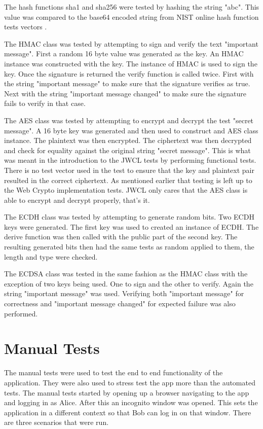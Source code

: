 The hash functions sha1 and sha256 were tested by hashing the string "abc". This value was compared to the base64 encoded string from NIST online hash function tests vectors \cite{test-vectors}.


The HMAC class was tested by attempting to sign and verify the text "important message". First a random 16 byte value was generated as the key. An HMAC instance was constructed with the key. The instance of HMAC is used to sign the key. Once the signature is returned the verify function is called twice. First with the string "important message" to make sure that the signature verifies as true. Next with the string "important message changed" to make sure the signature fails to verify in that case.


The AES class was tested by attempting to encrypt and decrypt the test "secret message". A 16 byte key was generated and then used to construct and AES class instance. The plaintext was then encrypted. The ciphertext was then decrypted and check for equality against the original string "secret message". This is what was meant in the introduction to the JWCL tests by performing functional tests. There is no test vector used in the test to ensure that the key and plaintext pair resulted in the correct ciphertext. As mentioned earlier that testing is left up to the Web Crypto implementation tests. JWCL only cares that the AES class is able to encrypt and decrypt properly, that's it.


The ECDH class was tested by attempting to generate random bits. Two ECDH keys were generated. The first key was used to created an instance of ECDH. The derive function was then called with the public part of the second key. The resulting generated bits then had the same tests as random applied to them, the length and type were checked.


The ECDSA class was tested in the same fashion as the HMAC class with the exception of two keys being used. One to sign and the other to verify. Again the string "important message" was used. Verifying both "important message" for correctness and "important message changed" for expected failure was also performed. 


\section{Manual Tests}


The manual tests were used to test the end to end functionality of the application. They were also used to stress test the app more than the automated tests. The manual tests started by opening up a browser navigating to the app and logging in as Alice. After this an incognito window was opened. This sets the application in a different context so that Bob can log in on that window. There are three scenarios that were run.


